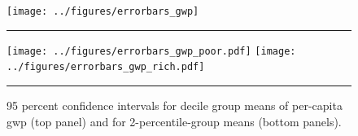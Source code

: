 \documentclass[a4paper,11pt,abstract=true]{scrartcl}
\begin{document}
\begin{figure}[htp]
  \centering
  \texttt{[image: ../figures/errorbars\_gwp]}

  \rule{1.05cm}{0pt}\texttt{[image: ../figures/errorbars\_gwp\_poor.pdf]}
  \hfill
  \texttt{[image: ../figures/errorbars\_gwp\_rich.pdf]}\rule{1.05cm}{0pt}
  \caption[CI for mean \ac{gwp}]{95 percent confidence intervals for decile group means of per-capita \ac{gwp} (top panel) and for 2-percentile-group means (bottom panels).}
  \label{fig:ci_gwp}
\end{figure}



\end{document}
